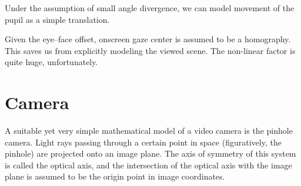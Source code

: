 Under the assumption of small angle divergence, we can model movement of the pupil as a simple translation.

Given the eye--face offset, onscreen gaze center is assumed to be a homography.
This saves us from explicitly modeling the viewed scene.
The non-linear factor is quite huge, unfortunately.

\section{Camera}

A suitable yet very simple mathematical model of a video camera is the pinhole camera.
Light rays passing through a certain point in space (figuratively, the pinhole) are projected onto an image plane.
The axis of symmetry of this system is called the optical axis, and the intersection of the optical axis with the image plane is assumed to be the origin point in image coordinates.

